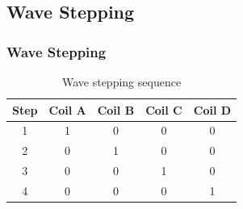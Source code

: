 \documentclass[table,10pt,red]{beamer}	%
\begin{document}
\subsection{Wave Stepping}

\begin{frame}
	\frametitle{Wave Stepping}
	\pause
	\begin{table}
		\begin{tabular}{c c c c c}
			\toprule
			\textbf{Step} & \textbf{Coil A} & \textbf{Coil B} & \textbf{Coil C} & \textbf{Coil D}\\
			\midrule
			1 & 1 & 0 & 0 & 0 \\
			2 & 0 & 1 & 0 & 0 \\
			3 & 0 & 0 & 1 & 0 \\
			4 & 0 & 0 & 0 & 1 \\
			\bottomrule
		\end{tabular}
		\caption{Wave stepping sequence}
	\end{table}
\end{frame}
\end{document}
